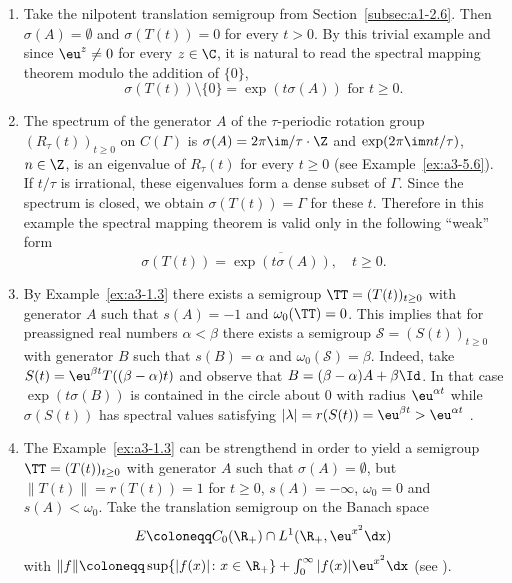 \begin{example}\label{ex:a3-6.1}%
\begin{enumerate}[\upshape (i), wide, labelindent=.25em]

\item
{}
Take the nilpotent translation semigroup from Section~\ref{subsec:a1-2.6}. Then $\sigma(A) = \emptyset$ and $\sigma(T(t)) = 0$ for every $t > 0$.
By this trivial example and since $\eu^{z} \neq 0$ for every $z \in \C$, it is natural to read the spectral mapping theorem modulo the addition of\/ $\{0\}$, \ie 
\[
\sigma(T(t)) \setminus \{0\} = \exp(t\sigma(A))  \text{ for } t \geq 0 .
\]

\item
{}
The spectrum of the generator $A$ of the $\tau$-periodic rotation group $(R_{\tau}(t))_{t \geq 0}$ on $C(\Gamma)$ is $\sigma(A) = 2\pi\im /\tau\cdot\Z$ and $\exp(2\pi\im nt/\tau)$, $n \in \Z$, is an eigenvalue of\/ $R_{\tau}(t)$ for every $t \geq 0$ (see Example~\ref{ex:a3-5.6}).
If\/ $t/\tau$ is irrational, these eigenvalues form a dense subset of\/ $\Gamma$.
Since the spectrum is closed, we obtain $\sigma(T(t)) = \Gamma$ for these $t$.
Therefore in this example the spectral mapping theorem is valid only in the following \enquote{weak} form
\[
\sigma(T(t)) = \overline{\exp(t\sigma(A))}, \quad t \geq 0 .
\]

\item 
By Example~\ref{ex:a3-1.3} there exists a semigroup $\TT = (T(t))_{t \geq 0}$ with generator $A$ such that $s(A) = -1$ and $\omega_{0}(\TT) = 0$.
This implies that for preassigned real numbers $\alpha < \beta$ there exists a semigroup $\mathcal{S} = (S(t))_{t \geq 0}$ with generator $B$ such that $s(B) = \alpha$ and $\omega_{0}(\mathcal{S}) = \beta$. Indeed, take $S(t) = \eu^{\beta t}T((\beta - \alpha)t)$ and observe that $B = (\beta-\alpha)A + \beta\Id$. 
In that case $\exp(t\sigma(B))$ is contained in the circle about $0$ with radius $\eu^{\alpha t}$ 
while $\sigma(S(t))$ has spectral values satisfying $|\lambda| = r(S(t)) = \eu^{\beta t} > \eu^{\alpha t}$ .


\item 
The Example~\ref{ex:a3-1.3} can be strengthend in order to yield a semigroup $\TT = (T(t))_{t \geq 0}$ with generator $A$ such that $\sigma(A) = \emptyset$, but $\|T(t)\| = r(T(t)) = 1$ for $t \geq 0$, \ie $s(A) = -\infty$, $\omega_{0} = 0$ and $s(A) < \omega_{0}$. 
Take the translation semigroup on the Banach space
\[
E \coloneqq C_{0}(\R_{+}) \cap L^{1}(\R_{+}, \eu^{x^{2}}\dx)
\]
with $\|f\| \coloneqq \sup \{|f(x)| \colon x \in \R_{+}\} + \int_{0}^{\infty} |f(x)|\eu^{x^{2}} \dx$ (see \textcite{greinervoigtwolff:1981}).


\end{enumerate}
\end{example}
